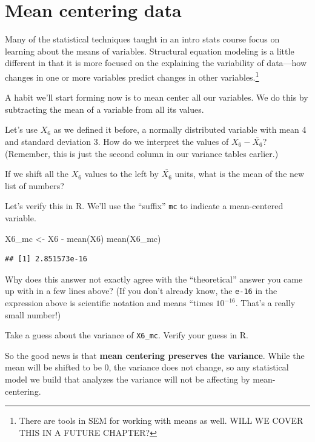 \documentclass[
]{book}
\newenvironment{Shaded}{\begin{snugshade}}{\end{snugshade}}
\newcommand{\FunctionTok}[1]{\textcolor[rgb]{0.00,0.00,0.00}{#1}}
\newcommand{\NormalTok}[1]{#1}
\newcommand{\OtherTok}[1]{\textcolor[rgb]{0.56,0.35,0.01}{#1}}
\newcommand{\SpecialCharTok}[1]{\textcolor[rgb]{0.00,0.00,0.00}{#1}}
\begin{document}
\hypertarget{variance-mean-centering}{%
\section{Mean centering data}\label{variance-mean-centering}}

Many of the statistical techniques taught in an intro stats course focus on learning about the means of variables. Structural equation modeling is a little different in that it is more focused on the explaining the variability of data---how changes in one or more variables predict changes in other variables.\footnote{There are tools in SEM for working with means as well. WILL WE COVER THIS IN A FUTURE CHAPTER?}

A habit we'll start forming now is to mean center all our variables. We do this by subtracting the mean of a variable from all its values.

Let's use \(X_{6}\) as we defined it before, a normally distributed variable with mean 4 and standard deviation 3. How do we interpret the values of \(X_{6} - \overline{X_{6}}\)? (Remember, this is just the second column in our variance tables earlier.)

If we shift all the \(X_{6}\) values to the left by \(\overline{X_{6}}\) units, what is the mean of the new list of numbers?

Let's verify this in R. We'll use the ``suffix'' \texttt{mc} to indicate a mean-centered variable.

\begin{Shaded}
\begin{Highlighting}[]
\NormalTok{X6\_mc }\OtherTok{\textless{}{-}}\NormalTok{ X6 }\SpecialCharTok{{-}} \FunctionTok{mean}\NormalTok{(X6)}
\FunctionTok{mean}\NormalTok{(X6\_mc)}
\end{Highlighting}
\end{Shaded}

\begin{verbatim}
## [1] 2.851573e-16
\end{verbatim}

Why does this answer not exactly agree with the ``theoretical'' answer you came up with in a few lines above? (If you don't already know, the \texttt{e-16} in the expression above is scientific notation and means ``times \(10^{-16}\). That's a really small number!)

Take a guess about the variance of \texttt{X6\_mc}. Verify your guess in R.

So the good news is that \textbf{mean centering preserves the variance}. While the mean will be shifted to be 0, the variance does not change, so any statistical model we build that analyzes the variance will not be affecting by mean-centering.
\end{document}
